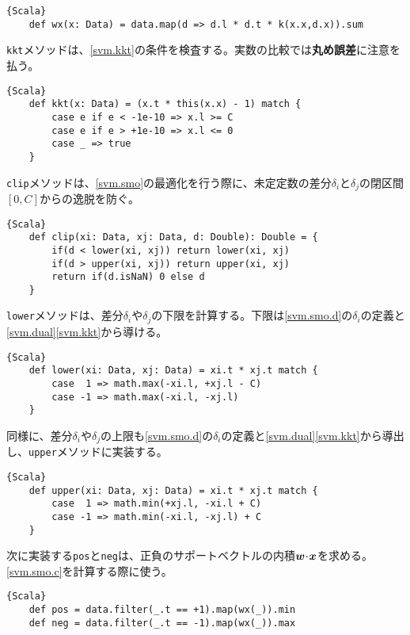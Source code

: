 \documentclass[10pt,a4paper]{book}
\begin{document}
\begin{Verbatim}{Scala}
	def wx(x: Data) = data.map(d => d.l * d.t * k(x.x,d.x)).sum
\end{Verbatim}

\texttt{kkt}メソッドは、\eqref{svm.kkt}の\KKT 条件を検査する。実数の比較では\textbf{丸め誤差}に注意を払う。

\begin{Verbatim}{Scala}
	def kkt(x: Data) = (x.t * this(x.x) - 1) match {
		case e if e < -1e-10 => x.l >= C
		case e if e > +1e-10 => x.l <= 0
		case _ => true
	}
\end{Verbatim}

\texttt{clip}メソッドは、\eqref{svm.smo}の最適化を行う際に、未定定数の差分$\delta_i$と$\delta_j$の閉区間$[0,C]$からの逸脱を防ぐ。

\begin{Verbatim}{Scala}
	def clip(xi: Data, xj: Data, d: Double): Double = {
		if(d < lower(xi, xj)) return lower(xi, xj)
		if(d > upper(xi, xj)) return upper(xi, xj)
		return if(d.isNaN) 0 else d
	}
\end{Verbatim}

\texttt{lower}メソッドは、差分$\delta_i$や$\delta_j$の下限を計算する。下限は\eqref{svm.smo.d}の$\delta_i$の定義と\eqref{svm.dual}\eqref{svm.kkt}から導ける。

\begin{Verbatim}{Scala}
	def lower(xi: Data, xj: Data) = xi.t * xj.t match {
		case  1 => math.max(-xi.l, +xj.l - C)
		case -1 => math.max(-xi.l, -xj.l)
	}
\end{Verbatim}

同様に、差分$\delta_i$や$\delta_j$の上限も\eqref{svm.smo.d}の$\delta_i$の定義と\eqref{svm.dual}\eqref{svm.kkt}から導出し、\texttt{upper}メソッドに実装する。

\begin{Verbatim}{Scala}
	def upper(xi: Data, xj: Data) = xi.t * xj.t match {
		case  1 => math.min(+xj.l, -xi.l + C)
		case -1 => math.min(-xi.l, -xj.l) + C
	}
\end{Verbatim}

次に実装する\texttt{pos}と\texttt{neg}は、正負のサポートベクトルの内積$\bm{w}\! \cdot \!\bm{x}$を求める。\eqref{svm.smo.c}を計算する際に使う。

\begin{Verbatim}{Scala}
	def pos = data.filter(_.t == +1).map(wx(_)).min
	def neg = data.filter(_.t == -1).map(wx(_)).max
\end{Verbatim}
\end{document}
